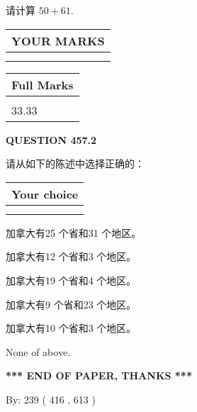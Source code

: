 \documentclass{ctexart}
\begin{document}
  
 
请计算 $ %
50 +  %
61 $.
 

 

 
  
\vspace{0.2in}
  
\noindent\begin{tabular}{|l|}
\hline
 YOUR MARKS  \\
\hline
 \\ 
 \\ 
\hline
\end{tabular}
\hspace{0.05in} \begin{tabular}{|l|}
\hline
 Full Marks  \\
\hline
 \\ 
33.33 \\
\hline
\end{tabular}
{\textbf{\Large{QUESTION
457.2 
}}}
  
  
请从如下的陈述中选择正确的：
  
  
\noindent\hspace{3.0in} \begin{tabular}{|l|}
\hline
Your choice \\
\hline
 \\ 
 \\ 
\hline
\end{tabular}
  
  
 
 
加拿大有25 个省和31 个地区。
 
 
加拿大有12 个省和3 个地区。
 
 
加拿大有19 个省和4 个地区。
 
 
加拿大有9 个省和23 个地区。
 
 
加拿大有10 个省和3 个地区。
 
 
 None of above.
 
 
   
   
 \vspace{0.2in}
 
   
   
   
   
\vspace{1.0in} 
{\textbf{\large{ *** END OF PAPER, THANKS *** }}} 
   
   
\hspace{1.0in} By: 
 239 ( 416 ,  613 )
   
\end{document}
